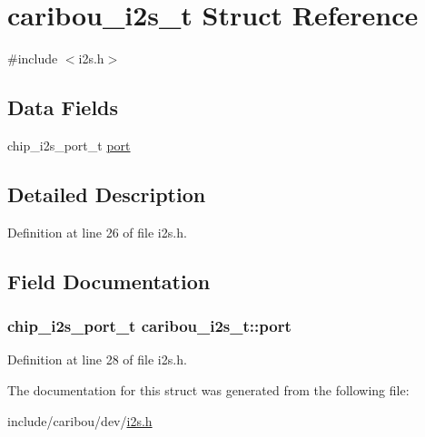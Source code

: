 \hypertarget{structcaribou__i2s__t}{\section{caribou\-\_\-i2s\-\_\-t Struct Reference}
\label{structcaribou__i2s__t}
}


{\ttfamily \#include $<$i2s.\-h$>$}

\subsection*{Data Fields}
\begin{DoxyCompactItemize}
\item 
chip\-\_\-i2s\-\_\-port\-\_\-t \hyperlink{structcaribou__i2s__t_a19ef2c09b1cbef9acbb9092b54243a76}{port}
\end{DoxyCompactItemize}


\subsection{Detailed Description}


Definition at line 26 of file i2s.\-h.



\subsection{Field Documentation}
\hypertarget{structcaribou__i2s__t_a19ef2c09b1cbef9acbb9092b54243a76}{
\subsubsection[{port}]{\setlength{\rightskip}{0pt plus 5cm}chip\-\_\-i2s\-\_\-port\-\_\-t caribou\-\_\-i2s\-\_\-t\-::port}}\label{structcaribou__i2s__t_a19ef2c09b1cbef9acbb9092b54243a76}


Definition at line 28 of file i2s.\-h.



The documentation for this struct was generated from the following file\-:\begin{DoxyCompactItemize}
\item 
include/caribou/dev/\hyperlink{i2s_8h}{i2s.\-h}\end{DoxyCompactItemize}
